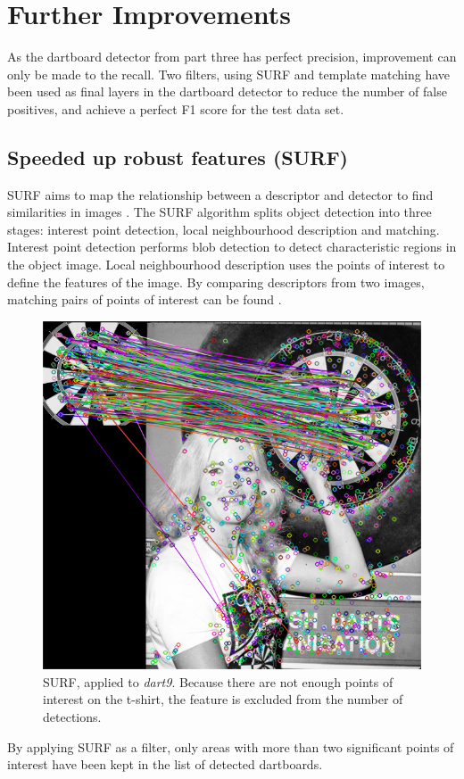 \documentclass[conference]{IEEEtran}
\begin{document}
\newpage
\section{Further Improvements}
As the dartboard detector from part three has perfect precision, improvement can only be made to the recall. Two filters, using SURF and template matching have been used as final layers in the dartboard detector to reduce the number of false positives, and achieve a perfect F1 score for the test data set. 
\par
\subsection{Speeded up robust features (SURF)}
SURF aims to map the relationship between a descriptor and detector to find similarities in images \cite{bay2006surf}. The SURF algorithm splits object detection into three stages: interest point detection, local neighbourhood description and matching. Interest point detection performs blob detection to detect characteristic regions in the object image. Local neighbourhood description uses the points of interest to define the features of the image. By comparing descriptors from two images, matching pairs of points of interest can be found \cite{surf_site}. 
\par

\begin{figure}[!htb]
\begin{center}
\includegraphics[width=0.6\linewidth]{images/SURF.png}
\caption{SURF, applied to \emph{dart9}. Because there are not enough points of interest on the t-shirt, the feature is excluded from the number of detections. }
\label{default}
\end{center}
\end{figure}
\par
By applying SURF as a filter, only areas with more than two significant points of interest have been kept in the list of detected dartboards.
\end{document}
